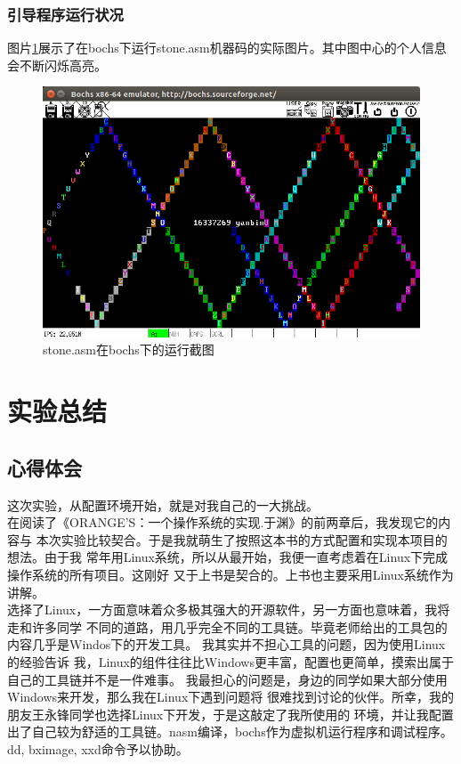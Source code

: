 \documentclass[a4paper]{article}
\begin{document}
    \subsubsection{引导程序运行状况}
    图片\ref{fig:stone_run}展示了在bochs下运行stone.asm机器码的实际图片。其中图中心的个人信息会不断闪烁高亮。\\
    
    \begin{figure}
        \begin{center}
        \includegraphics[scale=0.45]{asset/stone_run.png}
        \caption{stone.asm在bochs下的运行截图\label{fig:stone_run} }
        \end{center} 
    \end{figure} 
    
\section{实验总结}
\subsection{心得体会}
这次实验，从配置环境开始，就是对我自己的一大挑战。\\ 

在阅读了《ORANGE’S：一个操作系统的实现.于渊》的前两章后，我发现它的内容与
本次实验比较契合。于是我就萌生了按照这本书的方式配置和实现本项目的想法。由于我
常年用Linux系统，所以从最开始，我便一直考虑着在Linux下完成操作系统的所有项目。这刚好
又于上书是契合的。上书也主要采用Linux系统作为讲解。\\ 

选择了Linux，一方面意味着众多极其强大的开源软件，另一方面也意味着，我将走和许多同学
不同的道路，用几乎完全不同的工具链。毕竟老师给出的工具包的内容几乎是Windos下的开发工具。
我其实并不担心工具的问题，因为使用Linux的经验告诉
我，Linux的组件往往比Windows更丰富，配置也更简单，摸索出属于自己的工具链并不是一件难事。
我最担心的问题是，身边的同学如果大部分使用Windows来开发，那么我在Linux下遇到问题将
很难找到讨论的伙伴。所幸，我的朋友王永锋同学也选择Linux下开发，于是这敲定了我所使用的
环境，并让我配置出了自己较为舒适的工具链。nasm编译，bochs作为虚拟机运行程序和调试程序。
dd, bximage, xxd命令予以协助。\\
\end{document}
